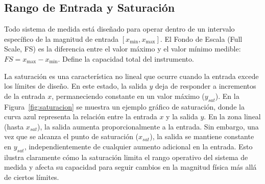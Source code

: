 \subsection{Rango de Entrada y Saturación}

Todo sistema de medida está diseñado para operar dentro de un intervalo específico de la magnitud de entrada $[x_{\min}, x_{\max}]$. El Fondo de Escala (Full Scale, FS) es la diferencia entre el valor máximo y el valor mínimo medible: $FS = x_{\max} - x_{\min}$. Define la capacidad total del instrumento.
    
La saturación es una característica no lineal que ocurre cuando la entrada excede los límites de diseño. En este estado, la salida $y$ deja de responder a incrementos de la entrada $x$, permaneciendo constante en un valor máximo ($y_{sat}$). En la Figura~\ref{fig:saturacion} se muestra un ejemplo gráfico de saturación, donde la curva azul representa la relación entre la entrada $x$ y la salida $y$. En la zona lineal (hasta $x_{sat}$), la salida aumenta proporcionalmente a la entrada. Sin embargo, una vez que se alcanza el punto de saturación ($x_{sat}$), la salida se mantiene constante en $y_{sat}$, independientemente de cualquier aumento adicional en la entrada. Esto ilustra claramente cómo la saturación limita el rango operativo del sistema de medida y afecta su capacidad para seguir cambios en la magnitud física más allá de ciertos límites.

\begin{marginfigure}
    \centering
    \shorthandoff{>}
    \caption[Característica de saturación.]{Característica de saturación. Físicamente, suele estar impuesta por los límites de alimentación de la electrónica o la deformación máxima del material del sensor.}\label{fig:saturacion}
\end{marginfigure}

